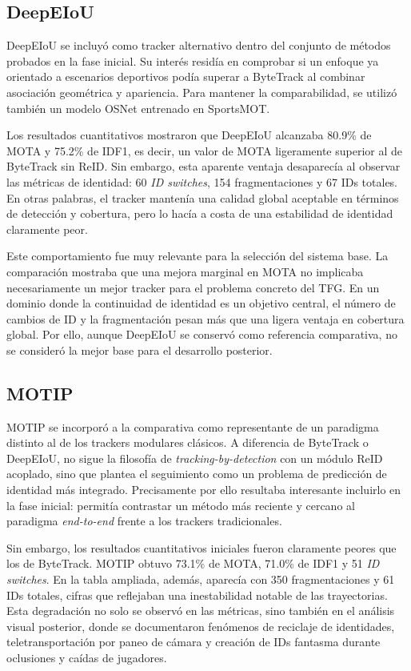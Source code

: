 \documentclass[../MAIN.tex]{subfiles}
\begin{document}
	\subsection{DeepEIoU}
	
	DeepEIoU se incluyó como tracker alternativo dentro del conjunto de métodos probados en la fase inicial. Su interés residía en comprobar si un enfoque ya orientado a escenarios deportivos podía superar a ByteTrack al combinar asociación geométrica y apariencia. Para mantener la comparabilidad, se utilizó también un modelo OSNet entrenado en SportsMOT.
	
	Los resultados cuantitativos mostraron que DeepEIoU alcanzaba 80.9\% de MOTA y 75.2\% de IDF1, es decir, un valor de MOTA ligeramente superior al de ByteTrack sin ReID. Sin embargo, esta aparente ventaja desaparecía al observar las métricas de identidad: 60 \textit{ID switches}, 154 fragmentaciones y 67 IDs totales. En otras palabras, el tracker mantenía una calidad global aceptable en términos de detección y cobertura, pero lo hacía a costa de una estabilidad de identidad claramente peor.
	
	Este comportamiento fue muy relevante para la selección del sistema base. La comparación mostraba que una mejora marginal en MOTA no implicaba necesariamente un mejor tracker para el problema concreto del TFG. En un dominio donde la continuidad de identidad es un objetivo central, el número de cambios de ID y la fragmentación pesan más que una ligera ventaja en cobertura global. Por ello, aunque DeepEIoU se conservó como referencia comparativa, no se consideró la mejor base para el desarrollo posterior.
	
	\subsection{MOTIP}
	
	MOTIP se incorporó a la comparativa como representante de un paradigma distinto al de los trackers modulares clásicos. A diferencia de ByteTrack o DeepEIoU, no sigue la filosofía de \textit{tracking-by-detection} con un módulo ReID acoplado, sino que plantea el seguimiento como un problema de predicción de identidad más integrado. Precisamente por ello resultaba interesante incluirlo en la fase inicial: permitía contrastar un método más reciente y cercano al paradigma \textit{end-to-end} frente a los trackers tradicionales.
	
	Sin embargo, los resultados cuantitativos iniciales fueron claramente peores que los de ByteTrack. MOTIP obtuvo 73.1\% de MOTA, 71.0\% de IDF1 y 51 \textit{ID switches}. En la tabla ampliada, además, aparecía con 350 fragmentaciones y 61 IDs totales, cifras que reflejaban una inestabilidad notable de las trayectorias. Esta degradación no solo se observó en las métricas, sino también en el análisis visual posterior, donde se documentaron fenómenos de reciclaje de identidades, teletransportación por paneo de cámara y creación de IDs fantasma durante oclusiones y caídas de jugadores.
	
\end{document}
